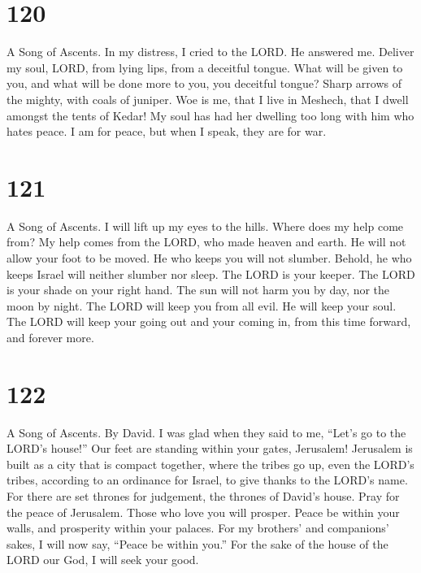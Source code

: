 \hypertarget{section-112}{%
\section{120}\label{section-112}}

A Song of Ascents.  In my distress, I cried to the LORD.
He answered me.  Deliver my soul, LORD, from lying lips,
from a deceitful tongue.  What will be given to you, and
what will be done more to you, you deceitful tongue? 
Sharp arrows of the mighty, with coals of juniper.  Woe is
me, that I live in Meshech, that I dwell amongst the tents of Kedar!
 My soul has had her dwelling too long with him who hates
peace.  I am for peace, but when I speak, they are for
war.

\hypertarget{section-113}{%
\section{121}\label{section-113}}

A Song of Ascents.  I will lift up my eyes to the hills.
Where does my help come from?  My help comes from the
LORD, who made heaven and earth.  He will not allow your
foot to be moved. He who keeps you will not slumber. 
Behold, he who keeps Israel will neither slumber nor sleep.
 The LORD is your keeper. The LORD is your shade on your
right hand.  The sun will not harm you by day, nor the
moon by night.  The LORD will keep you from all evil. He
will keep your soul.  The LORD will keep your going out
and your coming in, from this time forward, and forever more.

\hypertarget{section-114}{%
\section{122}\label{section-114}}

A Song of Ascents. By David.  I was glad when they said to
me, ``Let's go to the LORD's house!''  Our feet are
standing within your gates, Jerusalem!  Jerusalem is built
as a city that is compact together,  where the tribes go
up, even the LORD's tribes, according to an ordinance for Israel, to
give thanks to the LORD's name.  For there are set thrones
for judgement, the thrones of David's house.  Pray for the
peace of Jerusalem. Those who love you will prosper. 
Peace be within your walls, and prosperity within your palaces.
 For my brothers' and companions' sakes, I will now say,
``Peace be within you.''  For the sake of the house of the
LORD our God, I will seek your good.

